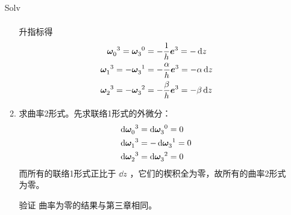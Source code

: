 \begin{xiti}
\begin{jie}
\begin{enumerate}
\begin{yl}{Solv}
\begin{enumerate}[leftmargin=2em]
\begin{align*}
            		\end{align*}
            		升指标得
            		\begin{align*}
            		\tensor{\bm{\omega}}{_0^3} = \tensor{\bm{\omega}}{_3^0} &= - \frac{1}{h} \bm{e}^3 = - \dd{z}\\
            		\tensor{\bm{\omega}}{_1^3} = - \tensor{\bm{\omega}}{_3^1} &= - \frac{\alpha}{h} \bm{e}^3 = - \alpha \dd{z}\\
            		\tensor{\bm{\omega}}{_2^3} = - \tensor{\bm{\omega}}{_3^2} &= - \frac{\beta}{h} \bm{e}^3 = - \beta \dd{z}
            		\end{align*}
            		\item 求曲率2形式。先求联络1形式的外微分：
            		\begin{align*}
            		\dd{\tensor{\bm{\omega}}{_0^3}} &= \dd{\tensor{\bm{\omega}}{_3^0}} = 0\\
            		\dd{\tensor{\bm{\omega}}{_1^3}} &= - \dd{\tensor{\bm{\omega}}{_3^1}} = 0\\
            		\dd{\tensor{\bm{\omega}}{_2^3}} &= \dd{\tensor{\bm{\omega}}{_3^2}} = 0
            		\end{align*}
            		而所有的联络1形式正比于 $\dd{z}$ ，它们的楔积全为零，故所有的曲率2形式为零。
            		\item[{\heiti 验证}] 曲率为零的结果与第三章相同。
            	\end{enumerate}
            \end{yl}
		\end{enumerate}
	\end{jie}
\end{xiti}